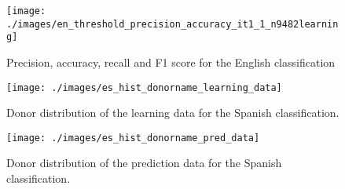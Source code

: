 \documentclass[
]{article}
\begin{document}
\begin{figure}

{\centering \texttt{[image: ./images/en\_threshold\_precision\_accuracy\_it1\_1\_n9482learning]} 

}

\caption{Precision, accuracy, recall and F1 score for the English classification}\label{fig:Appendix-B-precision}
\end{figure}

\begin{figure}

{\centering \texttt{[image: ./images/es\_hist\_donorname\_learning\_data]} 

}

\caption{Donor distribution of the learning data for the Spanish classification.}\label{fig:Appendix-B-es-donor-learning}
\end{figure}

\begin{figure}

{\centering \texttt{[image: ./images/es\_hist\_donorname\_pred\_data]} 

}

\caption{Donor distribution of the prediction data for the Spanish classification.}\label{fig:Appendix-B-es-donor-pred}
\end{figure}
\end{document}
